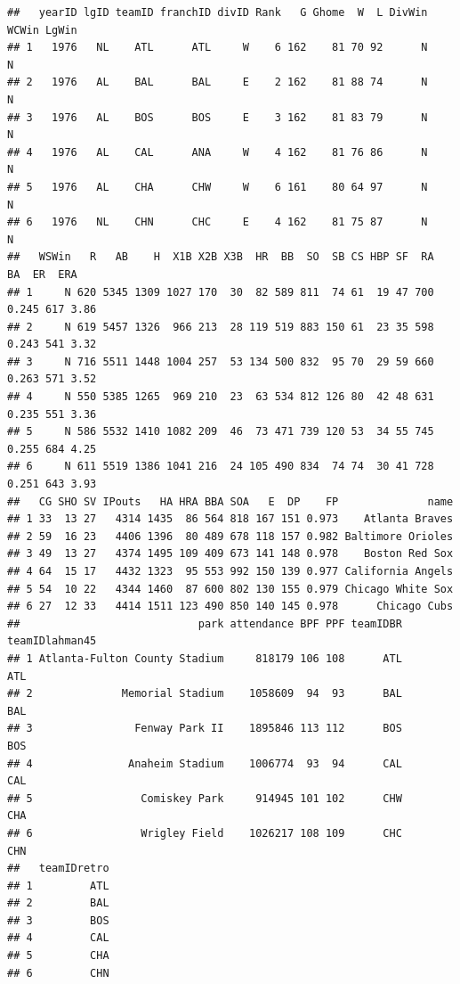 \documentclass[]{article}
\begin{document}
\begin{verbatim}
##   yearID lgID teamID franchID divID Rank   G Ghome  W  L DivWin WCWin LgWin
## 1   1976   NL    ATL      ATL     W    6 162    81 70 92      N           N
## 2   1976   AL    BAL      BAL     E    2 162    81 88 74      N           N
## 3   1976   AL    BOS      BOS     E    3 162    81 83 79      N           N
## 4   1976   AL    CAL      ANA     W    4 162    81 76 86      N           N
## 5   1976   AL    CHA      CHW     W    6 161    80 64 97      N           N
## 6   1976   NL    CHN      CHC     E    4 162    81 75 87      N           N
##   WSWin   R   AB    H  X1B X2B X3B  HR  BB  SO  SB CS HBP SF  RA    BA  ER  ERA
## 1     N 620 5345 1309 1027 170  30  82 589 811  74 61  19 47 700 0.245 617 3.86
## 2     N 619 5457 1326  966 213  28 119 519 883 150 61  23 35 598 0.243 541 3.32
## 3     N 716 5511 1448 1004 257  53 134 500 832  95 70  29 59 660 0.263 571 3.52
## 4     N 550 5385 1265  969 210  23  63 534 812 126 80  42 48 631 0.235 551 3.36
## 5     N 586 5532 1410 1082 209  46  73 471 739 120 53  34 55 745 0.255 684 4.25
## 6     N 611 5519 1386 1041 216  24 105 490 834  74 74  30 41 728 0.251 643 3.93
##   CG SHO SV IPouts   HA HRA BBA SOA   E  DP    FP              name
## 1 33  13 27   4314 1435  86 564 818 167 151 0.973    Atlanta Braves
## 2 59  16 23   4406 1396  80 489 678 118 157 0.982 Baltimore Orioles
## 3 49  13 27   4374 1495 109 409 673 141 148 0.978    Boston Red Sox
## 4 64  15 17   4432 1323  95 553 992 150 139 0.977 California Angels
## 5 54  10 22   4344 1460  87 600 802 130 155 0.979 Chicago White Sox
## 6 27  12 33   4414 1511 123 490 850 140 145 0.978      Chicago Cubs
##                            park attendance BPF PPF teamIDBR teamIDlahman45
## 1 Atlanta-Fulton County Stadium     818179 106 108      ATL            ATL
## 2              Memorial Stadium    1058609  94  93      BAL            BAL
## 3                Fenway Park II    1895846 113 112      BOS            BOS
## 4               Anaheim Stadium    1006774  93  94      CAL            CAL
## 5                 Comiskey Park     914945 101 102      CHW            CHA
## 6                 Wrigley Field    1026217 108 109      CHC            CHN
##   teamIDretro
## 1         ATL
## 2         BAL
## 3         BOS
## 4         CAL
## 5         CHA
## 6         CHN
\end{verbatim}
\end{document}
